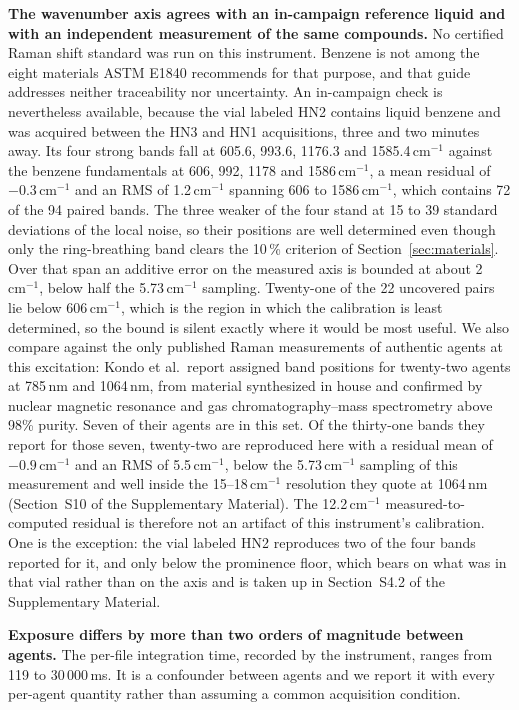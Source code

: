 \documentclass[review,12pt]{elsarticle}
\newcommand*\wn{\ensuremath{\text{cm}^{-1}}}
\begin{document}
\textbf{The wavenumber axis agrees with an in-campaign reference liquid and with an
independent measurement of the same compounds.} No certified Raman shift standard was run
on this instrument. Benzene is not among the eight materials ASTM E1840 recommends for
that purpose, and that guide addresses neither traceability nor
uncertainty.\cite{ntziouni2022standards} An in-campaign check is nevertheless available,
because the vial labeled HN2 contains liquid benzene and was acquired between the HN3 and
HN1 acquisitions, three and two minutes away. Its four strong bands fall at 605.6, 993.6,
1176.3 and 1585.4\,\wn{} against the benzene fundamentals at 606, 992, 1178 and
1586\,\wn{},\cite{zhang2011benzene} a mean residual of $-0.3$\,\wn{} and an RMS of
1.2\,\wn{} spanning 606 to 1586\,\wn{}, which contains 72 of the 94 paired bands. The
three weaker of the four stand at 15 to 39 standard deviations of the local noise, so
their positions are well determined even though only the ring-breathing band clears the
10\,\% criterion of Section~\ref{sec:materials}. Over that span an additive error on the
measured axis is bounded at about 2\,\wn{}, below half the 5.73\,\wn{} sampling. Twenty-one
of the 22 uncovered pairs lie below 606\,\wn{}, which is the region in which the
calibration is least determined, so the bound is silent exactly where it would be most
useful. We also compare against the only published Raman measurements of
authentic agents at this excitation: Kondo et al.\ report assigned band positions for twenty-two agents at
785\,nm and 1064\,nm, from material synthesized in house and confirmed by nuclear
magnetic resonance and gas chromatography--mass spectrometry above 98\%
purity.\cite{kondo2018analysis} Seven of their agents are in this set. Of the thirty-one
bands they report for those seven, twenty-two are reproduced here with a residual mean of
$-0.9$\,\wn{} and an RMS of 5.5\,\wn{}, below the 5.73\,\wn{} sampling of this
measurement and well inside the 15--18\,\wn{} resolution they quote at 1064\,nm
(Section~S10 of the Supplementary Material). The 12.2\,\wn{} measured-to-computed residual is therefore
not an artifact of this instrument's calibration. One is the exception: the vial labeled HN2 reproduces two of the four bands reported for it, and only below the prominence floor, which bears on what was in that vial rather than on the axis and is taken up in Section~S4.2 of the Supplementary Material.

\textbf{Exposure differs by more than two orders of magnitude between agents.} The
per-file integration time, recorded by the instrument, ranges from 119 to 30\,000\,ms.
It is a confounder between agents and we report it with every per-agent quantity rather
than assuming a common acquisition condition.
\end{document}
